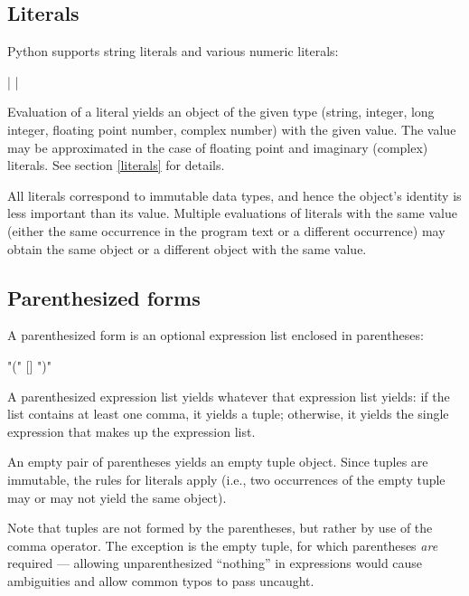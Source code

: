 \subsection{Literals\label{atom-literals}}

Python supports string literals and various numeric literals:

\begin{productionlist}
             { |  | }
\end{productionlist}

Evaluation of a literal yields an object of the given type (string,
integer, long integer, floating point number, complex number) with the
given value.  The value may be approximated in the case of floating
point and imaginary (complex) literals.  See section \ref{literals}
for details.

All literals correspond to immutable data types, and hence the
object's identity is less important than its value.  Multiple
evaluations of literals with the same value (either the same
occurrence in the program text or a different occurrence) may obtain
the same object or a different object with the same value.


\subsection{Parenthesized forms\label{parenthesized}}

A parenthesized form is an optional expression list enclosed in
parentheses:

\begin{productionlist}
             {"(" [] ")"}
\end{productionlist}

A parenthesized expression list yields whatever that expression list
yields: if the list contains at least one comma, it yields a tuple;
otherwise, it yields the single expression that makes up the
expression list.

An empty pair of parentheses yields an empty tuple object.  Since
tuples are immutable, the rules for literals apply (i.e., two
occurrences of the empty tuple may or may not yield the same object).

Note that tuples are not formed by the parentheses, but rather by use
of the comma operator.  The exception is the empty tuple, for which
parentheses \emph{are} required --- allowing unparenthesized ``nothing''
in expressions would cause ambiguities and allow common typos to
pass uncaught.



